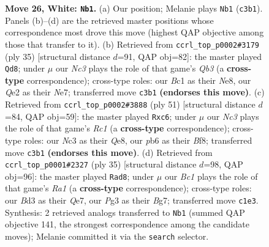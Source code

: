 \documentclass[11pt]{article}
\begin{document}
\begin{figure}[p]
\caption{\textbf{Move 26, White: \texttt{Nb1}.} (a) Our position; Melanie plays \texttt{Nb1} (\texttt{c3b1}). Panels (b)--(d) are the retrieved master positions whose correspondence most drove this move (highest QAP objective among those that transfer to it). (b) Retrieved from \texttt{ccrl\_top\_p0002\#3179} (ply 35) [structural distance $d$=91, QAP obj=82]: the master played \texttt{Qd8}; under $\mu$ our \emph{Nc3} plays the role of that game's \emph{Qb3} (a \textbf{cross-type} correspondence); cross-type roles: our \emph{B}c1 as their \emph{N}e8, our \emph{Q}e2 as their \emph{N}e7; transferred move \texttt{c3b1} \textbf{(endorses this move)}. (c) Retrieved from \texttt{ccrl\_top\_p0002\#3888} (ply 51) [structural distance $d$=84, QAP obj=59]: the master played \texttt{Rxc6}; under $\mu$ our \emph{Nc3} plays the role of that game's \emph{Rc1} (a \textbf{cross-type} correspondence); cross-type roles: our \emph{N}c3 as their \emph{Q}e8, our \emph{p}b6 as their \emph{B}f8; transferred move \texttt{c3b1} \textbf{(endorses this move)}. (d) Retrieved from \texttt{ccrl\_top\_p0001\#2327} (ply 35) [structural distance $d$=98, QAP obj=96]: the master played \texttt{Rad8}; under $\mu$ our \emph{Bc1} plays the role of that game's \emph{Ra1} (a \textbf{cross-type} correspondence); cross-type roles: our \emph{B}d3 as their \emph{Q}e7, our \emph{P}g3 as their \emph{B}g7; transferred move \texttt{c1e3}. Synthesis: 2 retrieved analogs transferred to \texttt{Nb1} (summed QAP objective 141, the strongest correspondence among the candidate moves); Melanie committed it via the \texttt{search} selector.}
\label{fig:thought-m50}
\end{figure}

\clearpage
\end{document}
